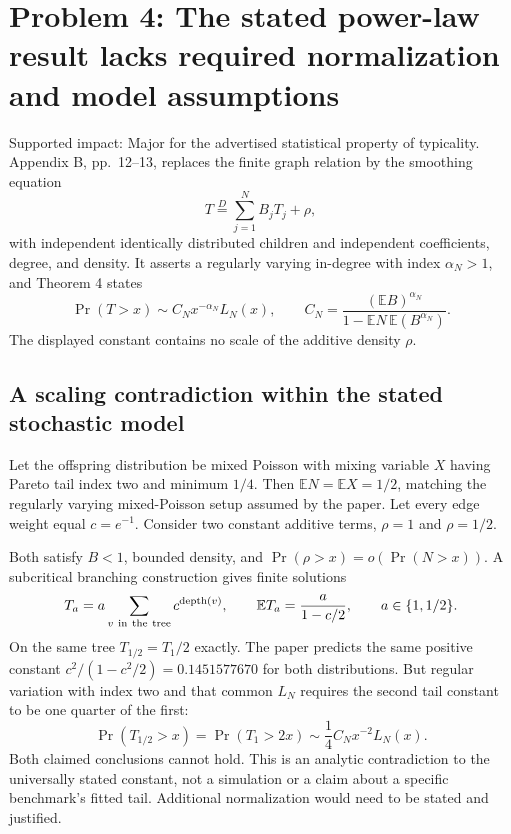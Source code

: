\documentclass[10pt]{article}
\begin{document}
\section*{Problem 4: The stated power-law result lacks required normalization and model assumptions}
Supported impact: Major for the advertised statistical property of typicality. Appendix B, pp. 12–13, replaces the finite graph relation by the smoothing equation \[T\overset{D}=\sum_{j=1}^{N}B_jT_j+\rho,\] with independent identically distributed children and independent coefficients, degree, and density. It asserts a regularly varying in-degree with index \(\alpha_N>1\), and Theorem 4 states \[\Pr(T>x)\sim C_Nx^{-\alpha_N}L_N(x),\qquad
 C_N=\frac{(\mathbb EB)^{\alpha_N}}
 {1-\mathbb EN\,\mathbb E(B^{\alpha_N})}.\] The displayed constant contains no scale of the additive density \(\rho\).\par
\subsection*{A scaling contradiction within the stated stochastic model}
Let the offspring distribution be mixed Poisson with mixing variable \(X\) having Pareto tail index two and minimum \(1/4\). Then \(\mathbb EN=\mathbb EX=1/2\), matching the regularly varying mixed-Poisson setup assumed by the paper. Let every edge weight equal \(c=e^{-1}\). Consider two constant additive terms, \(\rho=1\) and \(\rho=1/2\).\par
Both satisfy \(B<1\), bounded density, and \(\Pr(\rho>x)=o(\Pr(N>x))\). A subcritical branching construction gives finite solutions \[T_a=a\sum_{v\ {\rm in\ the\ tree}}c^{\operatorname{depth}(v)},
 \qquad \mathbb ET_a=\frac{a}{1-c/2},\qquad a\in\{1,1/2\}.\] On the same tree \(T_{1/2}=T_1/2\) exactly. The paper predicts the same positive constant \(c^2/(1-c^2/2)=0.1451577670\) for both distributions. But regular variation with index two and that common \(L_N\) requires the second tail constant to be one quarter of the first: \[\Pr(T_{1/2}>x)=\Pr(T_1>2x)
 \sim \frac14 C_N x^{-2}L_N(x).\] Both claimed conclusions cannot hold. This is an analytic contradiction to the universally stated constant, not a simulation or a claim about a specific benchmark’s fitted tail. Additional normalization would need to be stated and justified.\par
\end{document}
